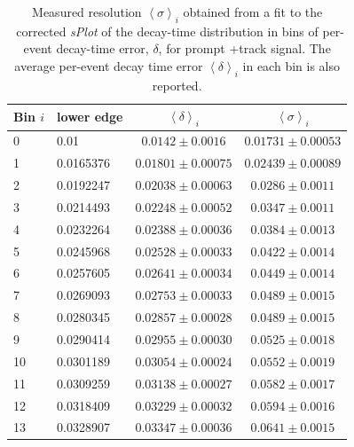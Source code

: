 \begin{table}[tbp]
	\centering
	\caption{Measured resolution $\left<\sigma\right>_{i}$ obtained from a fit to the \pt~corrected \emph{sPlot} of the decay-time distribution in bins of per-event decay-time error, $\delta$, for prompt \Dmp+track signal. The average per-event decay time error $\left<\delta\right>_{i}$ in each bin is also reported.
	\label{tab:resPedtefit}
	}
	\begin{tabular}{llcc}
		\toprule
		Bin $i$& lower edge & $\left<\delta\right>_{i}$ & $\left<\sigma\right>_{i}$ \\
		\midrule
		 0       &       0.01    &       $ 0.0142\pm 0.0016$     &       $ 0.01731\pm 0.00053$   \\
		  1       &       0.0165376       &       $ 0.01801\pm 0.00075$   &       $ 0.02439\pm 0.00089$   \\
		    2       &       0.0192247       &       $ 0.02038\pm 0.00063$   &       $ 0.0286\pm 0.0011$     \\
		    3       &       0.0214493       &       $ 0.02248\pm 0.00052$   &       $ 0.0347\pm 0.0011$     \\
		    4       &       0.0232264       &       $ 0.02388\pm 0.00036$   &       $ 0.0384\pm 0.0013$     \\
		    5       &       0.0245968       &       $ 0.02528\pm 0.00033$   &       $ 0.0422\pm 0.0014$     \\
		    6       &       0.0257605       &       $ 0.02641\pm 0.00034$   &       $ 0.0449\pm 0.0014$     \\
		    7       &       0.0269093       &       $ 0.02753\pm 0.00033$   &       $ 0.0489\pm 0.0015$     \\
		    8       &       0.0280345       &       $ 0.02857\pm 0.00028$   &       $ 0.0489\pm 0.0015$     \\
		    9       &       0.0290414       &       $ 0.02955\pm 0.00030$   &       $ 0.0525\pm 0.0018$     \\
		    10      &       0.0301189       &       $ 0.03054\pm 0.00024$   &       $ 0.0552\pm 0.0019$     \\
		    11      &       0.0309259       &       $ 0.03138\pm 0.00027$   &       $ 0.0582\pm 0.0017$     \\
		    12      &       0.0318409       &       $ 0.03229\pm 0.00032$   &       $ 0.0594\pm 0.0016$     \\
		    13      &       0.0328907       &       $ 0.03347\pm 0.00036$   &       $ 0.0641\pm 0.0015$     \\

\end{tabular}
\end{table}

